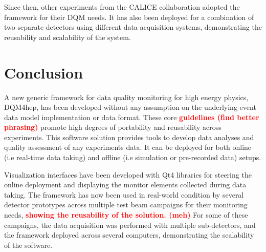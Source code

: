 \documentclass{webofc}
\begin{document}
Since then, other experiments from the CALICE collaboration adopted the framework for their DQM needs. It has also been deployed for a combination of two separate detectors using different data acquisition systems, demonstrating the reusability and scalability of the system.


\section{Conclusion}
\label{sec:conclusion}

A new generic framework for data quality monitoring for high energy physics, DQM4hep, has been developed without any assumption on the underlying event data model implementation or data format.
These core \textcolor{red}{\textbf{guidelines (find better phrasing)}} promote high degrees of portability and reusability across experiments.
This software solution provides tools to develop data analyses and quality assessment of any experiments data.
It can be deployed for both online (i.e real-time data taking) and offline (i.e simulation or pre-recorded data) setups.

Visualization interfaces have been developed with Qt4 libraries for steering the online deployment and displaying the monitor elements collected during data taking.
The framework has now been used in real-world condition by several detector prototypes across multiple test beam campaigns for their monitoring needs, \textcolor{red}{\textbf{showing the reusability of the solution. (meh)}}
For some of these campaigns, the data acquisition was performed with multiple sub-detectors, and the framework deployed across several computers, demonstrating the scalability of the software.



\end{document}
